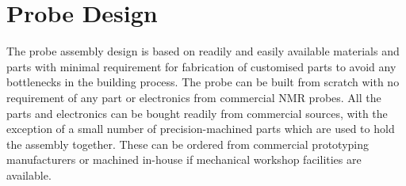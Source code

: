 \documentclass[preprint,12pt]{article}
\begin{document}
\section{Probe Design}
\label{sec:probe-design}
The probe assembly design is based on readily and easily available materials and parts with minimal requirement for fabrication of customised parts to avoid any bottlenecks in the building process. The probe can be built from scratch with no requirement of any part or electronics from commercial NMR probes. All the parts and electronics can be bought readily from commercial sources, with the exception of a small number of precision-machined parts which are used to hold the assembly together. These can be ordered from commercial prototyping manufacturers or machined in-house if mechanical workshop facilities are available.\par
\end{document}
